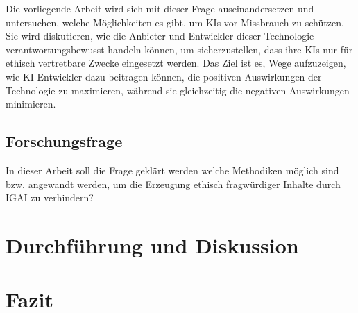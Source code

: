 \documentclass[12pt]{article}
\begin{document}
 Die vorliegende Arbeit wird sich mit dieser Frage auseinandersetzen und untersuchen, welche Möglichkeiten es gibt, um KIs vor Missbrauch zu schützen. Sie wird diskutieren, wie die Anbieter und Entwickler dieser Technologie verantwortungsbewusst handeln können, um sicherzustellen, dass ihre KIs nur für ethisch vertretbare Zwecke eingesetzt werden. Das Ziel ist es, Wege aufzuzeigen, wie KI-Entwickler dazu beitragen können, die positiven Auswirkungen der Technologie zu maximieren, während sie gleichzeitig die negativen Auswirkungen minimieren.
 \subsection{Forschungsfrage}
 In dieser Arbeit soll die Frage geklärt werden welche Methodiken möglich sind bzw. angewandt werden, um die Erzeugung ethisch 
 fragwürdiger Inhalte durch IGAI zu verhindern?
 

\section{Durchführung und Diskussion}
\section{Fazit}


\end{document}
